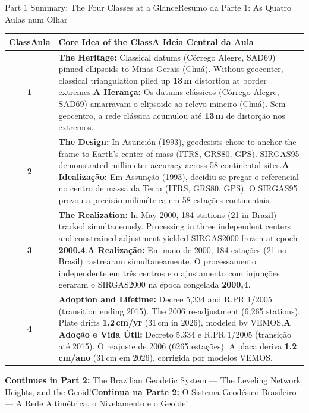 \documentclass[aspectratio=169,11pt]{beamer}
\newcommand{\tr}[2]{\ifEN#2\else#1\fi}
\newcommand{\bnum}[1]{\ifmmode\textcolor{mTeal}{\mathbf{#1}}\else\textbf{\textcolor{mTeal}{#1}}\fi}
\begin{document}
\begin{frame}{\tr{Resumo da Parte 1: As Quatro Aulas num Olhar}{Part 1 Summary: The Four Classes at a Glance}}
  \centering
  \scriptsize
  \begin{tabular}{cp{10.5cm}}
    \toprule
    \textbf{\tr{Aula}{Class}} & \textbf{\tr{A Ideia Central da Aula}{Core Idea of the Class}} \\
    \midrule
    \textbf{1} & \tr{\textbf{A Herança:} Os datums clássicos (Córrego Alegre, SAD69) amarravam o elipsoide ao relevo mineiro (Chuá). Sem geocentro, a rede clássica acumulou até \bnum{\num{13}\,m} de distorção nos extremos.}{\textbf{The Heritage:} Classical datums (Córrego Alegre, SAD69) pinned ellipsoids to Minas Gerais (Chuá). Without geocenter, classical triangulation piled up \bnum{\num{13}\,m} distortion at border extremes.} \\[3pt]
    \textbf{2} & \tr{\textbf{A Idealização:} Em Assunção (1993), decidiu-se pregar o referencial no centro de massa da Terra (ITRS, GRS80, GPS). O SIRGAS95 provou a precisão milimétrica em 58 estações continentais.}{\textbf{The Design:} In Asunción (1993), geodesists chose to anchor the frame to Earth's center of mass (ITRS, GRS80, GPS). SIRGAS95 demonstrated millimeter accuracy across 58 continental sites.} \\[3pt]
    \textbf{3} & \tr{\textbf{A Realização:} Em maio de 2000, 184 estações (21 no Brasil) rastrearam simultaneamente. O processamento independente em três centros e o ajustamento com injunções geraram o SIRGAS2000 na época congelada \bnum{2000,4}.}{\textbf{The Realization:} In May 2000, 184 stations (21 in Brazil) tracked simultaneously. Processing in three independent centers and constrained adjustment yielded SIRGAS2000 frozen at epoch \bnum{2000.4}.} \\[3pt]
    \textbf{4} & \tr{\textbf{A Adoção e Vida Útil:} Decreto 5.334 e R.PR 1/2005 (transição até 2015). O reajuste de 2006 (6265 estações). A placa deriva \bnum{\num{1.2}\,cm/ano} (\num{31}\,cm em 2026), corrigida por modelos VEMOS.}{\textbf{Adoption and Lifetime:} Decree 5,334 and R.PR 1/2005 (transition ending 2015). The 2006 re-adjustment (6,265 stations). Plate drifts \bnum{\num{1.2}\,cm/yr} (\num{31}\,cm in 2026), modeled by VEMOS.} \\
    \bottomrule
  \end{tabular}
  \vspace{0.25cm}
  \begin{ideia}
    \centering \footnotesize
    \tr{\textbf{Continua na Parte 2:} O Sistema Geodésico Brasileiro --- A Rede Altimétrica, o Nivelamento e o Geoide!}{\textbf{Continues in Part 2:} The Brazilian Geodetic System --- The Leveling Network, Heights, and the Geoid!}
  \end{ideia}
\end{frame}
\end{document}
